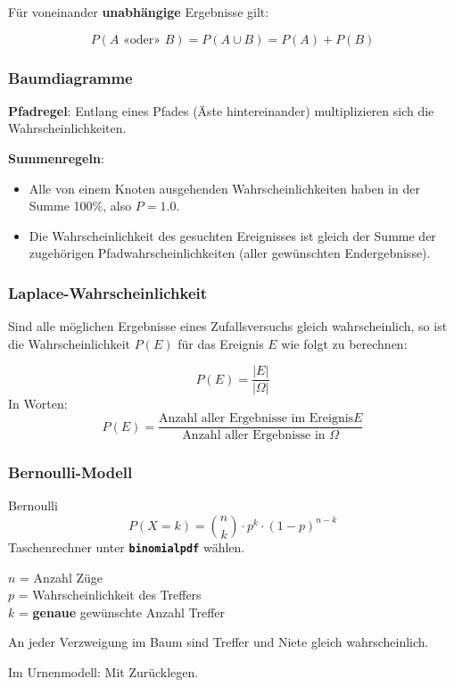 \begin{multicols}{2}
Für voneinander \textbf{unabhängige} Ergebnisse 
gilt:

$$P(A\textrm{ «oder» }B) = P(A\cup B) = P(A) + P(B)$$

\subsubsection{Baumdiagramme}

\textbf{Pfadregel}:
Entlang eines Pfades (Äste hintereinander) multiplizieren sich die
Wahrscheinlichkeiten.

\textbf{Summenregeln}:
\begin{itemize}
\item Alle von einem Knoten ausgehenden Wahrscheinlichkeiten haben in
der Summe 100\%, also $P=1.0$.
\item Die Wahrscheinlichkeit des gesuchten Ereignisses ist gleich der
Summe der zugehörigen Pfadwahrscheinlichkeiten (aller gewünschten Endergebnisse).
\end{itemize}




\subsubsection{Laplace-Wahrscheinlichkeit}
Sind alle möglichen Ergebnisse eines Zufallsversuchs gleich
wahrscheinlich, so ist die Wahrscheinlichkeit $P(E)$ für das Ereignis
$E$ wie folgt zu berechnen:

$$P(E) = \frac{|E|}{|\Omega|}$$
In Worten:
$$P(E) = \frac{\textrm{Anzahl aller Ergebnisse
im Ereignis
}E}{\textrm{Anzahl aller Ergebnisse in }\Omega}$$


\subsubsection{Bernoulli-Modell}
\begin{gesetz}{Bernoulli}{}
$$P(X=k) = {n \choose k}\cdot{}p^k\cdot{}(1-p)^{n-k}$$
Taschenrechner
unter  \textbf{\texttt{binomialpdf}} wählen.

$n$ = Anzahl Züge\\
$p$ = Wahrscheinlichkeit des Treffers\\
$k$ = \textbf{genaue} gewünschte Anzahl Treffer

An jeder Verzweigung im Baum sind Treffer und Niete gleich
wahrscheinlich.

Im Urnenmodell: Mit Zurücklegen.
\end{gesetz}


\end{multicols}
